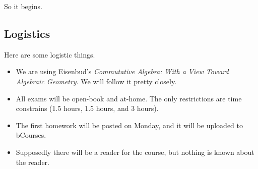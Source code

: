 







So it begins.

\subsection{Logistics}
Here are some logistic things.
\begin{itemize}
	\item We are using Eisenbud's \textit{Commutative Algebra: With a View Toward Algebraic Geometry}. We will follow it pretty closely.
	\item All exams will be open-book and at-home. The only restrictions are time constrains (1.5 hours, 1.5 hours, and 3 hours).
	\item The first homework will be posted on Monday, and it will be uploaded to {bCourses}.
	\item Supposedly there will be a reader for the course, but nothing is known about the reader.
\end{itemize}


